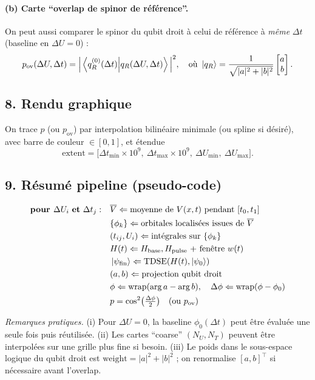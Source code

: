 \documentclass{article}
\begin{document}
\paragraph{(b) Carte “overlap de spinor de référence”.}
On peut aussi comparer le spinor du qubit droit à celui de référence à \emph{même} $\Delta t$ (baseline en $\Delta U=0$) :
\[
p_{\text{ov}}(\Delta U,\Delta t)
=\Big|\braket{q_R^{(0)}(\Delta t)}{q_R(\Delta U,\Delta t)}\Big|^2,
\quad
\text{où}\ \ket{q_R}=\frac{1}{\sqrt{|a|^2+|b|^2}}\begin{bmatrix}a\\ b\end{bmatrix}.
\]

\subsection*{8. Rendu graphique}
On trace $p$ (ou $p_{\text{ov}}$) par interpolation bilinéaire minimale (ou spline si désiré), avec barre de couleur $\in[0,1]$, et étendue
\[
\text{extent}=\big[\Delta t_{\min}\!\times\!10^9,\ \Delta t_{\max}\!\times\!10^9,\ \Delta U_{\min},\ \Delta U_{\max}\big].
\]

\subsection*{9. Résumé pipeline (pseudo-code)}
\begin{align*}
\textbf{pour } \Delta U_i \ \textbf{et}\ \Delta t_j:\quad
&\overline{V}\Leftarrow \text{moyenne de }V(x,t)\ \text{pendant }[t_0,t_1] \\
&\{\phi_k\}\Leftarrow \text{orbitales localisées issues de } \overline{V} \\
&(t_{ij},U_i)\Leftarrow \text{intégrales sur }\{\phi_k\} \\
&H(t)\Leftarrow H_{\text{base}},H_{\text{pulse}} \text{ + fenêtre } w(t) \\
&\ket{\psi_{\text{fin}}}\Leftarrow \text{TDSE}(H(t),\ket{\psi_0}) \\
&(a,b)\Leftarrow \text{projection qubit droit} \\
&\phi\Leftarrow \operatorname{wrap}(\arg a-\arg b),\quad
\Delta\phi\Leftarrow \operatorname{wrap}(\phi-\phi_0) \\
&p=\cos^2\!\big(\tfrac{\Delta\phi}{2}\big)\quad\text{(ou }p_{\text{ov}}\text{)}
\end{align*}

\noindent\textit{Remarques pratiques.} 
(i) Pour $\Delta U=0$, la baseline $\phi_0(\Delta t)$ peut être évaluée une seule fois puis réutilisée.
(ii) Les cartes “coarse” $(N_U,N_T)$ peuvent être interpolées sur une grille plus fine si besoin.
(iii) Le poids dans le sous-espace logique du qubit droit est $\mathrm{weight}=|a|^2+|b|^2$ ; on renormalise $[a,b]^\top$ si nécessaire avant l’overlap.
\end{document}
